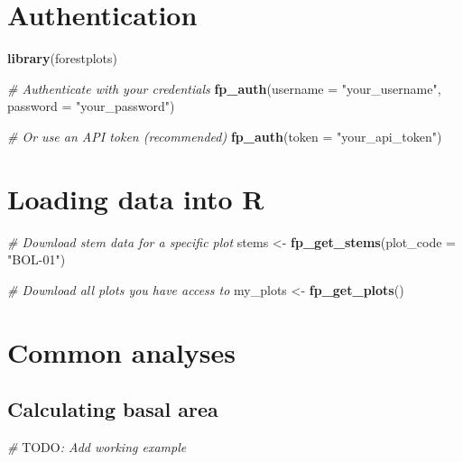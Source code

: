 \documentclass[
]{book}
\newenvironment{Shaded}{\begin{snugshade}}{\end{snugshade}}
\newcommand{\AlertTok}[1]{\textcolor[rgb]{0.94,0.16,0.16}{#1}}
\newcommand{\AttributeTok}[1]{\textcolor[rgb]{0.13,0.29,0.53}{#1}}
\newcommand{\CommentTok}[1]{\textcolor[rgb]{0.56,0.35,0.01}{\textit{#1}}}
\newcommand{\FunctionTok}[1]{\textcolor[rgb]{0.13,0.29,0.53}{\textbf{#1}}}
\newcommand{\NormalTok}[1]{#1}
\newcommand{\OtherTok}[1]{\textcolor[rgb]{0.56,0.35,0.01}{#1}}
\newcommand{\StringTok}[1]{\textcolor[rgb]{0.31,0.60,0.02}{#1}}
\begin{document}
\section{Authentication}\label{authentication}

\begin{Shaded}
\begin{Highlighting}[]
\FunctionTok{library}\NormalTok{(forestplots)}

\CommentTok{\# Authenticate with your credentials}
\FunctionTok{fp\_auth}\NormalTok{(}\AttributeTok{username =} \StringTok{"your\_username"}\NormalTok{, }\AttributeTok{password =} \StringTok{"your\_password"}\NormalTok{)}

\CommentTok{\# Or use an API token (recommended)}
\FunctionTok{fp\_auth}\NormalTok{(}\AttributeTok{token =} \StringTok{"your\_api\_token"}\NormalTok{)}
\end{Highlighting}
\end{Shaded}

\section{Loading data into R}\label{loading-data-into-r}

\begin{Shaded}
\begin{Highlighting}[]
\CommentTok{\# Download stem data for a specific plot}
\NormalTok{stems }\OtherTok{\textless{}{-}} \FunctionTok{fp\_get\_stems}\NormalTok{(}\AttributeTok{plot\_code =} \StringTok{"BOL{-}01"}\NormalTok{)}

\CommentTok{\# Download all plots you have access to}
\NormalTok{my\_plots }\OtherTok{\textless{}{-}} \FunctionTok{fp\_get\_plots}\NormalTok{()}
\end{Highlighting}
\end{Shaded}

\section{Common analyses}\label{common-analyses}

\subsection{Calculating basal area}\label{calculating-basal-area}

\begin{Shaded}
\begin{Highlighting}[]
\CommentTok{\# }\AlertTok{TODO}\CommentTok{: Add working example}
\end{Highlighting}
\end{Shaded}
\end{document}
